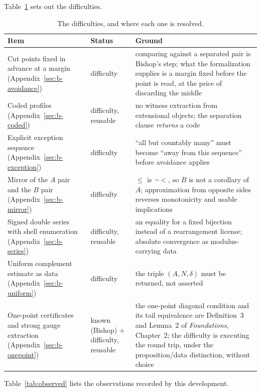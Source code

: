 \documentclass[11pt]{article}
\theoremstyle{definition}
\theoremstyle{remark}
\begin{document}
Table~\ref{tab:hard} sets out the difficulties.

\begin{table}[htbp]
\centering\small
\caption{The difficulties, and where each one is resolved.}
\label{tab:hard}
\setlength{\tabcolsep}{3pt}
\begin{tabular}{p{}p{}p{}}
\hline
Item & Status & Ground \\
\hline
Cut points fixed in advance at a margin (Appendix~\ref{sec:b-avoidance}) & difficulty & comparing against a separated pair is Bishop's step; what the formalization supplies is a margin fixed before the point is read, at the price of discarding the middle \\
Coded profiles (Appendix~\ref{sec:b-coded}) & difficulty, reusable & no witness extraction from extensional objects; the separation clause \emph{returns} a code \\
Explicit exception sequence (Appendix~\ref{sec:b-exception}) & difficulty & ``all but countably many'' must become ``away from this sequence'' before avoidance applies \\
Mirror of the $A$ pair and the $B$ pair (Appendix~\ref{sec:b-mirror}) & difficulty & $\le$ is $\neg<$, so $B$ is not a corollary of $A$; approximation from opposite sides reverses monotonicity and usable implications \\
Signed double series with shell enumeration (Appendix~\ref{sec:b-series}) & difficulty, reusable & an equality for a fixed bijection instead of a rearrangement license; absolute convergence as modulus-carrying data \\
Uniform complement estimate as data (Appendix~\ref{sec:b-uniform}) & difficulty & the triple $(A,N,\delta)$ must be returned, not asserted \\
One-point certificates and strong gauge extraction (Appendix~\ref{sec:b-onepoint}) & known (Bishop) $+$ difficulty, reusable & the one-point diagonal condition and its tail equivalence are Definition~3 and Lemma~2 of \emph{Foundations}, Chapter~2; the difficulty is executing the round trip, under the proposition/data distinction, without choice \\
\hline
\end{tabular}
\end{table}

Table~\ref{tab:observed} lists the observations recorded by this development.
\end{document}
